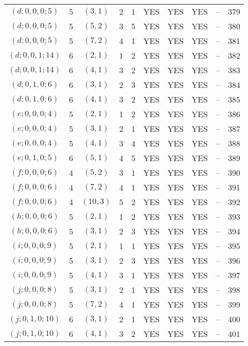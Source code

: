 \begin{longtable}{|c|c|c|c|c|c|c|c|c|c|}
$(d; 0, 0, 0; 5)$ & 5 & $(3, 1)$ & 2 & 1 & YES & YES & YES & -- & 379\\
$(d; 0, 0, 0; 5)$ & 5 & $(5, 2)$ & 3 & 5 & YES & YES & YES & -- & 380\\
$(d; 0, 0, 0; 5)$ & 5 & $(7, 2)$ & 4 & 1 & YES & YES & YES & -- & 381\\
$(d; 0, 0, 1; 14)$ & 6 & $(2, 1)$ & 1 & 2 & YES & YES & YES & -- & 382\\
$(d; 0, 0, 1; 14)$ & 6 & $(4, 1)$ & 3 & 2 & YES & YES & YES & -- & 383\\
$(d; 0, 1, 0; 6)$ & 6 & $(3, 1)$ & 2 & 3 & YES & YES & YES & -- & 384\\
$(d; 0, 1, 0; 6)$ & 6 & $(4, 1)$ & 3 & 2 & YES & YES & YES & -- & 385\\
$(e; 0, 0, 0; 4)$ & 5 & $(2, 1)$ & 1 & 2 & YES & YES & YES & -- & 386\\
$(e; 0, 0, 0; 4)$ & 5 & $(3, 1)$ & 2 & 1 & YES & YES & YES & -- & 387\\
$(e; 0, 0, 0; 4)$ & 5 & $(4, 1)$ & 3 & 4 & YES & YES & YES & -- & 388\\
$(e; 0, 1, 0; 5)$ & 6 & $(5, 1)$ & 4 & 5 & YES & YES & YES & -- & 389\\
$(f; 0, 0, 0; 6)$ & 4 & $(5, 2)$ & 3 & 1 & YES & YES & YES & -- & 390\\
$(f; 0, 0, 0; 6)$ & 4 & $(7, 2)$ & 4 & 1 & YES & YES & YES & -- & 391\\
$(f; 0, 0, 0; 6)$ & 4 & $(10, 3)$ & 5 & 2 & YES & YES & YES & -- & 392\\
$(h; 0, 0, 0; 6)$ & 5 & $(2, 1)$ & 1 & 2 & YES & YES & YES & -- & 393\\
$(h; 0, 0, 0; 6)$ & 5 & $(3, 1)$ & 2 & 3 & YES & YES & YES & -- & 394\\
$(i; 0, 0, 0; 9)$ & 5 & $(2, 1)$ & 1 & 1 & YES & YES & YES & -- & 395\\
$(i; 0, 0, 0; 9)$ & 5 & $(3, 1)$ & 2 & 3 & YES & YES & YES & -- & 396\\
$(i; 0, 0, 0; 9)$ & 5 & $(4, 1)$ & 3 & 1 & YES & YES & YES & -- & 397\\
$(j; 0, 0, 0; 8)$ & 5 & $(3, 1)$ & 2 & 1 & YES & YES & YES & -- & 398\\
$(j; 0, 0, 0; 8)$ & 5 & $(7, 2)$ & 4 & 1 & YES & YES & YES & -- & 399\\
$(j; 0, 1, 0; 10)$ & 6 & $(3, 1)$ & 2 & 1 & YES & YES & YES & -- & 400\\
$(j; 0, 1, 0; 10)$ & 6 & $(4, 1)$ & 3 & 2 & YES & YES & YES & -- & 401
\end{longtable}
